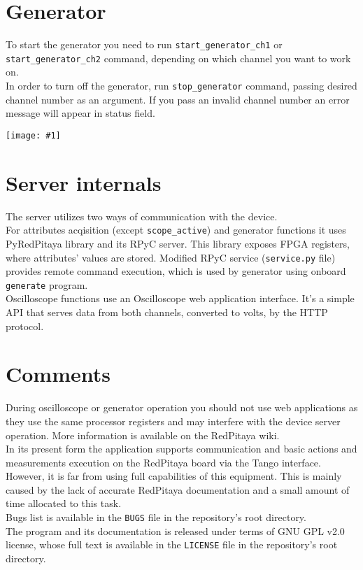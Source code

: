 \documentclass[12pt,a4paper]{article}
\newcommand{\screenshot}[1]{\begin{minipage}[c]{\textwidth}\texttt{[image: \#1]}\end{minipage}}
\begin{document}
	\section{Generator}
	To start the generator you need to run \texttt{start\_generator\_ch1} or \texttt{start\_generator\_ch2} command, depending on which channel you want to work on.\\
	In order to turn off the generator, run \texttt{stop\_generator} command, passing desired channel number as an argument.
	If you pass an invalid channel number an error message will appear in status field.\\
	\screenshot{screenshots/invalid_generator_channel.png}

	\section{Server internals}
	The server utilizes two ways of communication with the device.\\
	For attributes acqisition (except \texttt{scope\_active}) and generator functions it uses PyRedPitaya library and its RPyC server.
	This library exposes FPGA registers, where attributes' values are stored.
	Modified RPyC service (\texttt{service.py} file) provides remote command execution, which is used by generator using onboard \texttt{generate} program.\\
	Oscilloscope functions use an Oscilloscope web application interface. It's a simple API that serves data from both channels, converted to volts, by the HTTP protocol.

	\section{Comments}
	During oscilloscope or generator operation you should not use web applications as they use the same processor registers and may interfere with the device server operation. More information is available on the RedPitaya wiki.\\
	In its present form the application supports communication and basic actions and measurements execution on the RedPitaya board via the Tango interface.
	However, it is far from using full capabilities of this equipment. This is mainly caused by the lack of accurate RedPitaya documentation and a small amount of time allocated to this task.\\
	Bugs list is available in the \texttt{BUGS} file in the repository's root directory.\\
	The program and its documentation is released under terms of GNU GPL v2.0 license, whose full text is available in the \texttt{LICENSE} file in the repository's root directory. 
\end{document}

